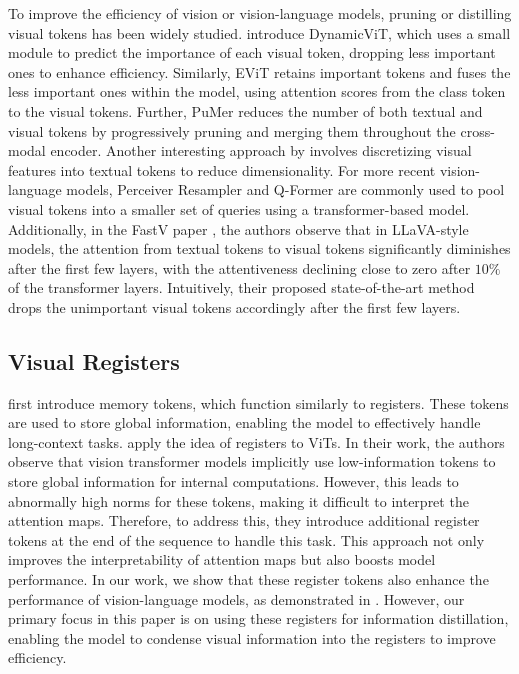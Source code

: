 \documentclass{article} %
\begin{document}
To improve the efficiency of vision or vision-language models, pruning or distilling visual tokens has been widely studied. \citet{rao2021dynamicvit} introduce DynamicViT, which uses a small module to predict the importance of each visual token, dropping less important ones to enhance efficiency. Similarly, EViT \citep{liang2022not} retains important tokens and fuses the less important ones within the model, using attention scores from the class token to the visual tokens. Further, PuMer \citep{cao2023pumer} reduces the number of both textual and visual tokens by progressively pruning and merging them throughout the cross-modal encoder. Another interesting approach by \citet{saifullah2023seeing} involves discretizing visual features into textual tokens to reduce dimensionality. For more recent vision-language models, Perceiver Resampler \citep{jaegle2021perceiver, alayrac2022flamingo, bai2023qwen} and Q-Former \citep{li2023blip} are commonly used to pool visual tokens into a smaller set of queries using a transformer-based model. Additionally, in the FastV paper \citep{chen2024image}, the authors observe that in LLaVA-style models, the attention from textual tokens to visual tokens significantly diminishes after the first few layers, with the attentiveness declining close to zero after $10\%$ of the transformer layers. Intuitively, their proposed state-of-the-art method drops the unimportant visual tokens accordingly after the first few layers.

\subsection{Visual Registers}

\citet{burtsev2020memory} first introduce memory tokens, which function similarly to registers. These tokens are used to store global information, enabling the model to effectively handle long-context tasks. \citet{darcet2023vision} apply the idea of registers to ViTs. In their work, the authors observe that vision transformer models implicitly use low-information tokens to store global information for internal computations. However, this leads to abnormally high norms for these tokens, making it difficult to interpret the attention maps. Therefore, to address this, they introduce additional register tokens at the end of the sequence to handle this task. This approach not only improves the interpretability of attention maps but also boosts model performance. In our work, we show that these register tokens also enhance the performance of vision-language models, as demonstrated in . However, our primary focus in this paper is on using these registers for information distillation, enabling the model to condense visual information into the registers to improve efficiency.
\end{document}
